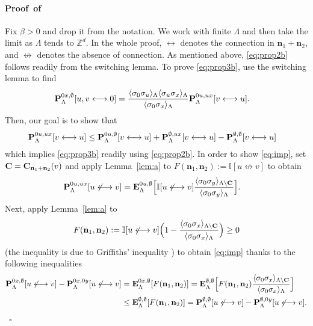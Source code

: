 \documentclass[a4paper,oneside,11pt]{article}
\def\Z{\mathbb{Z}}                          %
\newcommand{\be}[1]{\begin{equation}\label{#1}}
\newcommand{\ee}{\end{equation}}
\numberwithin{equation}{section}
\numberwithin{equation}{section}
\numberwithin{equation}{section}
\newenvironment{proof}[1][\relax]%
  {\paragraph{Proof\ifx#1\relax\else~of #1\fi}}%
  {~\hfill$\square$\par\bigskip}
\def\Z{\mathbb{Z}}                          %
\def\be{\begin{equation}}
\def\ee{\end{equation}}
\newcommand{\n}{\mathbf{n}}
\begin{document}
\begin{proof}
Fix $\beta>0$ and drop it from the notation. We work with finite $\Lambda$ and then take the limit as $\Lambda$ tends to $\Z^d$. In the whole proof, $\longleftrightarrow$ denotes the connection in $\n_1+\n_2$, and $\not\longleftrightarrow$ denotes the absence of connection.
As mentioned above, \eqref{eq:prop2b} follows readily from the switching lemma.
To prove \eqref{eq:prop3b}, use the switching lemma to find
\begin{align}{\bf P}^{0x,\emptyset}_\Lambda[u,v\longleftrightarrow0]&=\frac{\langle\sigma_0\sigma_u\rangle_\Lambda\langle\sigma_u\sigma_x\rangle_\Lambda}{\langle\sigma_0\sigma_x\rangle_\Lambda}{\bf P}^{0u,ux}_\Lambda[v\longleftrightarrow u].\end{align}
Then, our goal is to show that
\begin{align}\label{eq:imp}{\bf P}^{0u,ux}_\Lambda[v\longleftrightarrow u]&\le{\bf P}^{0u,\emptyset}_\Lambda[v\longleftrightarrow u]+{\bf P}^{\emptyset,ux}_\Lambda[v\longleftrightarrow u]-{\bf P}^{\emptyset,\emptyset}_\Lambda[v\longleftrightarrow u]
\end{align}
which implies \eqref{eq:prop3b} readily using \eqref{eq:prop2b}. 
In order to show \eqref{eq:imp}, set ${\bf C}={\bf C}_{\n_1+\n_2}(v)$ and apply Lemma~\ref{lem:a} to $F(\n_1,\n_2):=\mathbb I[u\not\longleftrightarrow v]$ to obtain 
\begin{align}\label{eq:hj}
{\bf P}^{0u,ux}_\Lambda[u\not\longleftrightarrow v]&={\bf E}^{0u,\emptyset}_\Lambda\Big[\mathbb  I[u\not\longleftrightarrow v]\frac{\langle\sigma_0\sigma_y\rangle_{\Lambda\setminus{\bf C}}}{\langle\sigma_0\sigma_y\rangle_\Lambda}\Big].
\end{align}
Next, apply Lemma~\ref{lem:a}   to 
\be
F(\n_1,\n_2):=\mathbb I[u\not\longleftrightarrow v]\Big(1-\frac{\langle\sigma_0\sigma_x\rangle_{\Lambda\setminus {\bf C}}}{\langle \sigma_0\sigma_x\rangle_\Lambda}\Big)\ge0
\ee (the inequality is due to Griffiths' inequality \cite{Gri67}) to obtain \eqref{eq:imp} thanks to the following inequalities
\begin{align}
{\bf P}^{0x,\emptyset}_\Lambda[u\not\longleftrightarrow v]-{\bf P}^{0x,0y}_\Lambda[u\not\longleftrightarrow v]&={\bf E}^{0x,\emptyset}_\Lambda[F(\n_1,\n_2)]={\bf E}^{\emptyset,\emptyset}_\Lambda\Big[F(\n_1,\n_2)\frac{\langle\sigma_0\sigma_x\rangle_{\Lambda\setminus{\bf C}}}{\langle\sigma_0\sigma_x\rangle_\Lambda}\Big]\nonumber\\
&\le {\bf E}^{\emptyset,\emptyset}_\Lambda[F(\n_1,\n_2)]={\bf P}^{\emptyset,\emptyset}_\Lambda[u\not\longleftrightarrow v]-{\bf P}^{\emptyset,0y}_\Lambda[u\not\longleftrightarrow v].
\end{align}
\end{proof}
\end{document}
